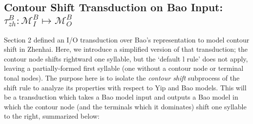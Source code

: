 \documentclass{article}
\begin{document}
\subsection{Contour Shift Transduction on Bao Input: $\tau^{B}_{zh}: \mathcal{M}^{B}_{I} \mapsto \mathcal{M}^{B}_{O}$}
Section 2 defined an I/O transduction over Bao's representation to model contour shift in Zhenhai. Here, we introduce a simplified version of that transduction; the contour node shifts rightward one syllable, but the `default l rule' does not apply, leaving a partially-formed first syllable (one without a contour node or terminal tonal nodes). The purpose here is to isolate the \emph{contour shift} subprocess of the shift rule to analyze its properties with respect to Yip and Bao models. This will be a transduction which takes a Bao model input and outputs a Bao model in which the contour node (and the terminals which it dominates) shift one syllable to the right, summarized below:
\end{document}
